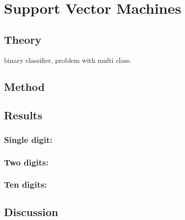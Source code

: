 \chapter{Support Vector Machines}
\section{Theory}
binary classifier, problem with multi class. 
\section{Method}

\section{Results}

\subsection{Single digit:}

\subsection{Two digits:}

\subsection{Ten digits:}

\section{Discussion}